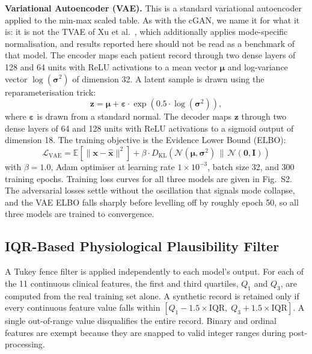 \documentclass[journal]{IEEEtran}
\begin{document}
\textbf{Variational Autoencoder (VAE).} This is a standard variational autoencoder applied to the min-max scaled table. As with the cGAN, we name it for what it is: it is not the TVAE of Xu et al.\ \cite{xu2019}, which additionally applies mode-specific normalisation, and results reported here should not be read as a benchmark of that model. The encoder maps each patient record through two dense layers of 128 and 64 units with ReLU activations to a mean vector $\boldsymbol{\mu}$ and log-variance vector $\log(\boldsymbol{\sigma}^2)$ of dimension 32. A latent sample is drawn using the reparameterisation trick:
\begin{equation}
\mathbf{z} = \boldsymbol{\mu} + \boldsymbol{\varepsilon} \cdot \exp(0.5 \cdot \log(\boldsymbol{\sigma}^2)),
\end{equation}
where $\boldsymbol{\varepsilon}$ is drawn from a standard normal. The decoder maps $\mathbf{z}$ through two dense layers of 64 and 128 units with ReLU activations to a sigmoid output of dimension 18. The training objective is the Evidence Lower Bound (ELBO):
\begin{equation}
\mathcal{L}_{\text{VAE}} = \mathbb{E}\!\left[\|\mathbf{x} - \hat{\mathbf{x}}\|^2\right] + \beta \cdot D_{\text{KL}}\!\left(\mathcal{N}(\boldsymbol{\mu}, \boldsymbol{\sigma}^2) \,\|\, \mathcal{N}(\mathbf{0}, \mathbf{I})\right)
\end{equation}
with $\beta = 1.0$, Adam optimiser at learning rate $1 \times 10^{-3}$, batch size 32, and 300 training epochs. Training loss curves for all three models are given in Fig.~S2. The adversarial losses settle without the oscillation that signals mode collapse, and the VAE ELBO falls sharply before levelling off by roughly epoch 50, so all three models are trained to convergence.

\subsection{IQR-Based Physiological Plausibility Filter}

A Tukey fence filter is applied independently to each model's output. For each of the 11 continuous clinical features, the first and third quartiles, $Q_1$ and $Q_3$, are computed from the real training set alone. A synthetic record is retained only if every continuous feature value falls within $[Q_1 - 1.5 \times \text{IQR},\; Q_3 + 1.5 \times \text{IQR}]$. A single out-of-range value disqualifies the entire record. Binary and ordinal features are exempt because they are snapped to valid integer ranges during post-processing.
\end{document}
